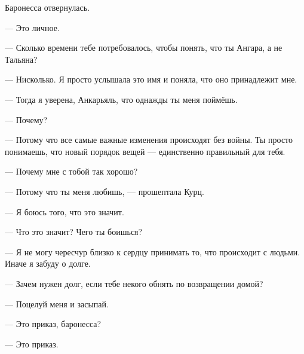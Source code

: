 \documentclass[a4paper,10pt,fleqn]{book}\usepackage{polyglossia}\setdefaultlanguage[babelshorthands=true]{russian}\setotherlanguage{english}\defaultfontfeatures{Ligatures=TeX,Mapping=tex-text}\usepackage{xcolor}\newcommand{\ml}[3]{#2}
\newcommand{\asterism}{\vspace{1em}{\centering\Large\bfseries$\ast~\ast~\ast$\par}\vspace{1em}}
\begin{document}
Баронесса отвернулась.

--- Это личное.

--- Сколько времени тебе потребовалось, чтобы понять, что ты Ангара, а не Тальяна?

--- Нисколько.
Я просто услышала это имя и поняла, что оно принадлежит мне.

--- Тогда я уверена, Анкарьяль, что однажды ты меня поймёшь.

--- Почему?

--- Потому что все самые важные изменения происходят без войны.
Ты просто понимаешь, что новый порядок вещей --- единственно правильный для тебя.

\asterism

--- Почему мне с тобой так хорошо?

--- Потому что ты меня любишь, --- прошептала Курц.

--- Я боюсь того, что это значит.

--- Что это значит?
Чего ты боишься?

--- Я не могу чересчур близко к сердцу принимать то, что происходит с людьми.
Иначе я забуду о долге.

--- Зачем нужен долг, если тебе некого обнять по возвращении домой?

--- Поцелуй меня и засыпай.

--- Это приказ, баронесса?

--- Это приказ.
\end{document}
